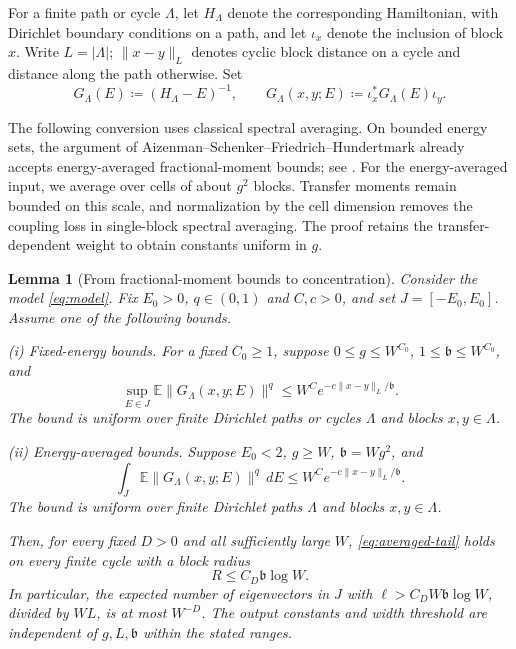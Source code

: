 \documentclass[11pt]{article}
\numberwithin{equation}{section}
\newtheorem{lemma}[theorem]{Lemma}
\theoremstyle{remark}
\newcommand{\E}{\mathbb E}
\begin{document}
For a finite path or cycle $\Lambda$, let $H_\Lambda$ denote the
corresponding Hamiltonian, with Dirichlet boundary conditions on a path,
and let $\iota_x$ denote the inclusion of block $x$. Write $L=|\Lambda|$;
$\|x-y\|_L$ denotes cyclic block distance on a cycle and distance along
the path otherwise. Set
\begin{equation}\label{up:eq:local-resolvent}
 G_\Lambda(E)\coloneqq(H_\Lambda-E)^{-1},\qquad
 G_\Lambda(x,y;E)\coloneqq\iota_x^*G_\Lambda(E)\iota_y.
\end{equation}

 
The following conversion uses classical spectral averaging.
On bounded energy sets, the argument of
Aizenman--Schenker--Friedrich--Hundertmark already accepts
energy-averaged fractional-moment bounds; see
\cite[Appendix~A, proof of Theorem~A.1, (A.10)--(A.12)]{ASFH}.
For the energy-averaged input, we average over cells of about $g^2$
blocks. Transfer moments remain bounded on this scale, and normalization
by the cell dimension removes the coupling loss in single-block
spectral averaging. The proof retains the transfer-dependent weight
to obtain constants uniform in $g$.

\begin{lemma}[From fractional-moment bounds to concentration]
\label{uva:thm:upper-audit}
Consider the model \eqref{eq:model}. Fix $E_0>0$, $q\in(0,1)$
and $C,c>0$, and set $J=[-E_0,E_0]$. Assume one of the following
bounds.

\noindent\textup{(i) Fixed-energy bounds.} For a fixed $C_0\ge1$, suppose
$0\le g\le W^{C_0}$, $1\le\mathfrak b\le W^{C_0}$, and
\begin{equation}\label{up:eq:fmr-pointwise}
 \sup_{E\in J}\E\|G_\Lambda(x,y;E)\|^q
 \le W^C e^{-c\|x-y\|_L/\mathfrak b}.
\end{equation}
The bound is uniform over finite Dirichlet paths or cycles $\Lambda$
and blocks $x,y\in\Lambda$.

\noindent\textup{(ii) Energy-averaged bounds.} Suppose $E_0<2$,
$g\ge W$, $\mathfrak b=Wg^2$, and
\begin{equation}\label{uva:eq:conversion-input}
 \int_J\E\|G_\Lambda(x,y;E)\|^q\,dE
 \le W^C e^{-c\|x-y\|_L/\mathfrak b}.
\end{equation}
The bound is uniform over finite Dirichlet paths $\Lambda$ and
blocks $x,y\in\Lambda$.

Then, for every fixed $D>0$ and all sufficiently large $W$,
\eqref{eq:averaged-tail} holds on every finite cycle with a block radius
\begin{equation}\label{uva:eq:conversion-radius}
 R\le C_D\mathfrak b\log W.
\end{equation}
In particular, the expected number of eigenvectors in $J$ with
$\ell>C_DW\mathfrak b\log W$, divided by $WL$,
is at most $W^{-D}$. The output constants and width threshold are
independent of $g,L,\mathfrak b$ within the stated ranges.
\end{lemma}
\end{document}
